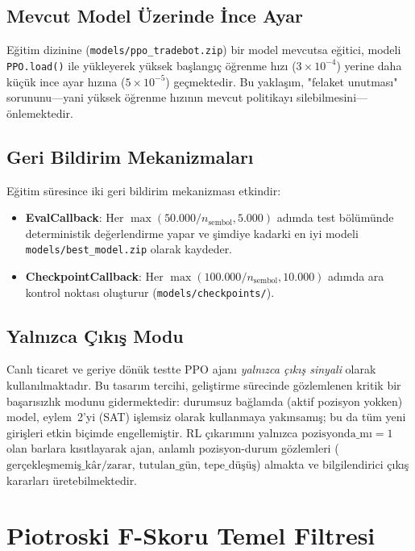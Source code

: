 \documentclass[journal]{IEEEtran}
\begin{document}
\subsection{Mevcut Model Üzerinde İnce Ayar}

Eğitim dizinine (\texttt{models/ppo\_tradebot.zip}) bir model
mevcutsa eğitici, modeli \texttt{PPO.load()} ile yükleyerek yüksek
başlangıç öğrenme hızı ($3 \times 10^{-4}$) yerine daha küçük ince
ayar hızına ($5 \times 10^{-5}$) geçmektedir. Bu yaklaşım, "felaket
unutması" sorununu—yani yüksek öğrenme hızının mevcut politikayı
silebilmesini—önlemektedir.

\subsection{Geri Bildirim Mekanizmaları}

Eğitim süresince iki geri bildirim mekanizması etkindir:
\begin{itemize}
  \item \textbf{EvalCallback}: Her $\max(50{.}000 / n_{\text{sembol}},
        5{.}000)$ adımda test bölümünde deterministik değerlendirme
        yapar ve şimdiye kadarki en iyi modeli
        \texttt{models/best\_model.zip} olarak kaydeder.
  \item \textbf{CheckpointCallback}: Her $\max(100{.}000 /
        n_{\text{sembol}}, 10{.}000)$ adımda ara kontrol noktası
        oluşturur (\texttt{models/checkpoints/}).
\end{itemize}

\subsection{Yalnızca Çıkış Modu}

Canlı ticaret ve geriye dönük testte PPO ajanı
\emph{yalnızca çıkış sinyali} olarak kullanılmaktadır. Bu tasarım
tercihi, geliştirme sürecinde gözlemlenen kritik bir başarısızlık
modunu gidermektedir: durumsuz bağlamda (aktif pozisyon yokken)
model, eylem~2'yi (SAT) işlemsiz olarak kullanmaya
yakınsamış; bu da tüm yeni girişleri etkin biçimde engellemiştir.
RL çıkarımını yalnızca $\text{pozisyonda\_mı}=1$ olan barlara
kısıtlayarak ajan, anlamlı pozisyon-durum gözlemleri
($\text{gerçekleşmemiş\_kâr/zarar}$, $\text{tutulan\_gün}$,
$\text{tepe\_düşüş}$) almakta ve bilgilendirici çıkış kararları
üretebilmektedir.

\section{Piotroski F-Skoru Temel Filtresi}
\end{document}
